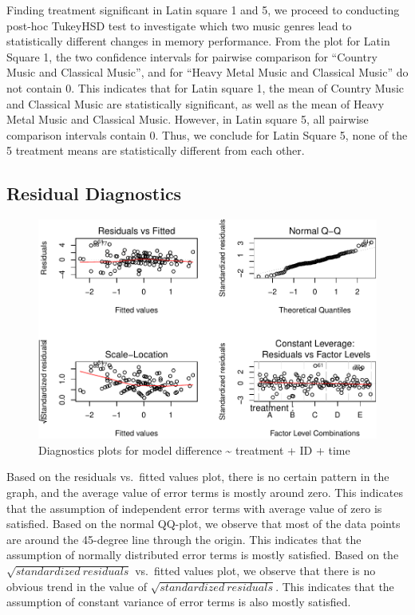 \documentclass[]{article}
\begin{document}
Finding treatment significant in Latin square 1 and 5, we proceed to
conducting post-hoc TukeyHSD test to investigate which two music genres
lead to statistically different changes in memory performance. From the
plot for Latin Square 1, the two confidence intervals for pairwise
comparison for ``Country Music and Classical Music'', and for ``Heavy
Metal Music and Classical Music'' do not contain 0. This indicates that
for Latin square 1, the mean of Country Music and Classical Music are
statistically significant, as well as the mean of Heavy Metal Music and
Classical Music. However, in Latin square 5, all pairwise comparison
intervals contain 0. Thus, we conclude for Latin Square 5, none of the 5
treatment means are statistically different from each other.

\subsection{Residual Diagnostics}\label{residual-diagnostics}

\begin{figure}
\centering
\includegraphics{music_memory_files/figure-latex/unnamed-chunk-8-1.pdf}
\caption{Diagnostics plots for model difference \textasciitilde{}
treatment + ID + time}
\end{figure}

Based on the residuals vs.~fitted values plot, there is no certain
pattern in the graph, and the average value of error terms is mostly
around zero. This indicates that the assumption of independent error
terms with average value of zero is satisfied. Based on the normal
QQ-plot, we observe that most of the data points are around the
45-degree line through the origin. This indicates that the assumption of
normally distributed error terms is mostly satisfied. Based on the
\(\sqrt{standardized\ residuals}\) vs.~fitted values plot, we observe
that there is no obvious trend in the value of
\(\sqrt{standardized\ residuals}\). This indicates that the assumption
of constant variance of error terms is also mostly satisfied.
\end{document}
